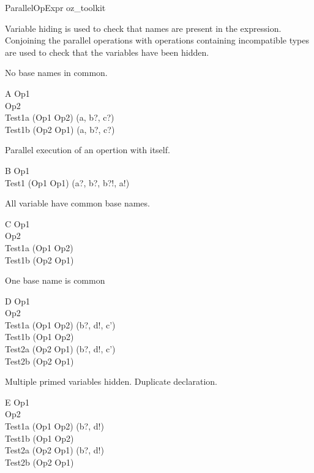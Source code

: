 \begin{zsection}
  \SECTION ParallelOpExpr \parents oz\_toolkit
\end{zsection}

Variable hiding is used to check that names are present in the
expression. Conjoining the parallel operations with operations
containing incompatible types are used to check that the variables
have been hidden.

No base names in common. 
\begin{class}{A}
  Op1 \\
  Op2 \\
  Test1a \sdef (Op1 \pll Op2) \hide (a, b?, c?)\\
  Test1b \sdef (Op2 \pll Op1) \hide (a, b?, c?)\\
\end{class}

Parallel execution of an opertion with itself.
\begin{class}{B}
  Op1 \\
  Test1 \sdef (Op1 \pll Op1) \hide (a?, b?, b?!, a!)
\end{class}

All variable have common base names.
\begin{class}{C}
  Op1 \\
  Op2 \\
  Test1a \sdef (Op1 \pll Op2) \\
  Test1b \sdef (Op2 \pll Op1) \\
\end{class}

One base name is common
\begin{class}{D}
  Op1 \\
  Op2 \\
  Test1a \sdef (Op1 \pll Op2) \hide (b?, d!, c')\\
  Test1b \sdef (Op1 \pll Op2) \\
  Test2a \sdef (Op2 \pll Op1) \hide (b?, d!, c')\\
  Test2b \sdef (Op2 \pll Op1) \\
\end{class}

Multiple primed variables hidden.
Duplicate declaration.
\begin{class}{E}
  Op1 \\
  Op2 \\
  Test1a \sdef (Op1 \pll Op2) \hide (b?, d!)\\
  Test1b \sdef (Op1 \pll Op2) \\
  Test2a \sdef (Op2 \pll Op1) \hide (b?, d!)\\
  Test2b \sdef (Op2 \pll Op1) 
\end{class}
